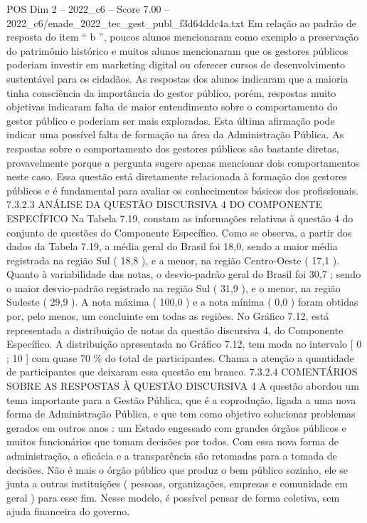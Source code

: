 \begin{textsample}{POS Dim 2 – 2022\_c6 – Score 7.00 – 2022\_c6/enade\_2022\_tec\_gest\_publ\_f3d64ddc4a.txt}
Em relação ao padrão de resposta do item “ b ”, poucos alunos mencionaram como exemplo a preservação do patrimônio histórico e muitos alunos mencionaram que os gestores públicos poderiam investir em marketing digital ou oferecer cursos de desenvolvimento sustentável para os cidadãos.
As respostas dos alunos indicaram que a maioria tinha consciência da importância do gestor público, porém, respostas muito objetivas indicaram falta de maior entendimento sobre o comportamento do gestor público e poderiam ser mais exploradas.
Esta última afirmação pode indicar uma possível falta de formação na área da Administração Pública.
As respostas sobre o comportamento dos gestores públicos são bastante diretas, provavelmente porque a pergunta sugere apenas mencionar dois comportamentos neste caso.
Essa questão está diretamente relacionada à formação dos gestores públicos e é fundamental para avaliar os conhecimentos básicos dos profissionais. 7.3.2.3 ANÁLISE DA QUESTÃO DISCURSIVA 4 DO COMPONENTE ESPECÍFICO Na Tabela 7.19, constam as informações relativas à questão 4 do conjunto de questões do Componente Específico.
Como se observa, a partir dos dados da Tabela 7.19, a média geral do Brasil foi 18,0, sendo a maior média registrada na região Sul ( 18,8 ), e a menor, na região Centro-Oeste ( 17,1 ).
Quanto à variabilidade das notas, o desvio-padrão geral do Brasil foi 30,7 ; sendo o maior desvio-padrão registrado na região Sul ( 31,9 ), e o menor, na região Sudeste ( 29,9 ).
A nota máxima ( 100,0 ) e a nota mínima ( 0,0 ) foram obtidas por, pelo menos, um concluinte em todas as regiões.
No Gráfico 7.12, está representada a distribuição de notas da questão discursiva 4, do Componente Específico.
A distribuição apresentada no Gráfico 7.12, tem moda no intervalo [ 0 ; 10 ] com quase 70 \% do total de participantes.
Chama a atenção a quantidade de participantes que deixaram essa questão em branco. 7.3.2.4 COMENTÁRIOS SOBRE AS RESPOSTAS À QUESTÃO DISCURSIVA 4 A questão abordou um tema importante para a Gestão Pública, que é a coprodução, ligada a uma nova forma de Administração Pública, e que tem como objetivo solucionar problemas gerados em outros anos : um Estado engessado com grandes órgãos públicos e muitos funcionários que tomam decisões por todos.
Com essa nova forma de administração, a eficácia e a transparência são retomadas para a tomada de decisões.
Não é mais o órgão público que produz o bem público sozinho, ele se junta a outras instituições ( pessoas, organizações, empresas e comunidade em geral ) para esse fim.
Nesse modelo, é possível pensar de forma coletiva, sem ajuda financeira do governo.

\end{textsample}
